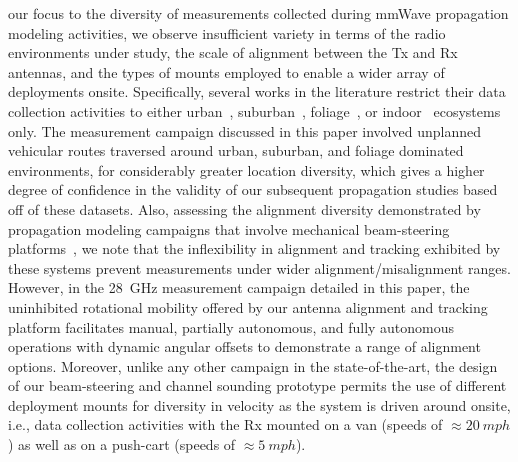 \documentclass[10pt, twocolumn]{IEEEtran}
\begin{document}
 our focus to the diversity of measurements collected during mmWave propagation modeling activities, we observe insufficient variety in terms of the radio environments under study, the scale of alignment between the Tx and Rx antennas, and the types of mounts employed to enable a wider array of deployments onsite. Specifically, several works in the literature restrict their data collection activities to either urban~\cite{Outdoor28G, PDAPs, QDC_NIST, DopplerHST, V2XBlockages, MacCartneyUrbanHumanBlockage}, suburban~\cite{Purdue, SuburbanGeometryJournal}, foliage~\cite{Foliage, FoliageSimulations}, or indoor~\cite{AgileLink, Harvard, SpatialConsistencyOriginal, SpatialDynamics, Indoor60G, D2DHumanBlockage} ecosystems only. The measurement campaign discussed in this paper involved unplanned vehicular routes traversed around urban, suburban, and foliage dominated environments, for considerably greater location diversity, which gives a higher degree of confidence in the validity of our subsequent propagation studies based off of these datasets. Also, assessing the alignment diversity demonstrated by propagation modeling campaigns that involve mechanical beam-steering platforms~\cite{Purdue, Harvard, SpatialConsistencyOriginal, SpatialDynamics, SuburbanGeometryJournal, Outdoor28G, QDC_NIST, D2DHumanBlockage, MacCartneyUrbanHumanBlockage}, we note that the inflexibility in alignment and tracking exhibited by these systems prevent measurements under wider alignment/misalignment ranges. However, in the \SI{28}{\giga\hertz} measurement campaign detailed in this paper, the uninhibited rotational mobility offered by our antenna alignment and tracking platform facilitates manual, partially autonomous, and fully autonomous operations with dynamic angular offsets to demonstrate a range of alignment options. Moreover, unlike any other campaign in the state-of-the-art, the design of our beam-steering and channel sounding prototype permits the use of different deployment mounts for diversity in velocity as the system is driven around onsite, i.e., data collection activities with the Rx mounted on a van (speeds of ${\approx}\SI{20}{mph}$) as well as on a push-cart (speeds of ${\approx}\SI{5}{mph}$).\\
\end{document}
